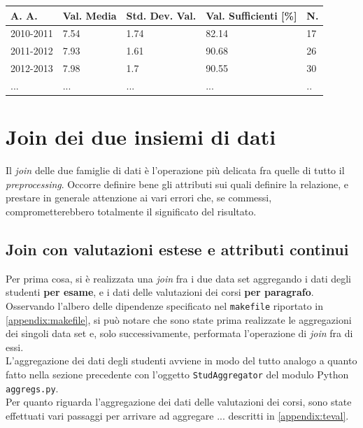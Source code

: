 		\begin{tabular}{lllll}
		\hline
		A. A. & Val. Media & Std. Dev. Val. & Val. Sufficienti {[}\%{]} & N. \\ \hline
		2010-2011 & 7.54 & 1.74 & 82.14 & 17 \\
		2011-2012 & 7.93 & 1.61 & 90.68 & 26 \\
		2012-2013 & 7.98 & 1.7 & 90.55 & 30 \\
		... & ... & ... & ... & .. \\ \hline
		\end{tabular}

		\vspace{0.3cm}

\section{Join dei due insiemi di dati}

	Il \textit{join} delle due famiglie di dati è l'operazione più delicata fra quelle di tutto il \textit{preprocessing}. Occorre definire bene gli attributi sui quali definire la relazione, e prestare in generale attenzione ai vari errori che, se commessi, comprometterebbero totalmente il significato del risultato. \\

	\subsection{Join con valutazioni estese e attributi continui}

		Per prima cosa, si è realizzata una \textit{join} fra i due data set aggregando i dati degli studenti \textbf{per esame}, e i dati delle valutazioni dei corsi \textbf{per paragrafo}. Osservando l'albero delle dipendenze specificato nel \texttt{makefile} riportato in \ref{appendix:makefile}, si può notare che sono state prima realizzate le aggregazioni dei singoli data set e, solo successivamente, performata l'operazione di \textit{join} fra di essi. \\

		L'aggregazione dei dati degli studenti avviene in modo del tutto analogo a quanto fatto nella sezione precedente con l'oggetto \texttt{StudAggregator} del modulo Python \texttt{aggregs.py}. \\

		Per quanto riguarda l'aggregazione dei dati delle valutazioni dei corsi, sono state effettuati vari passaggi per arrivare ad aggregare ... descritti in \ref{appendix:teval}. \\


